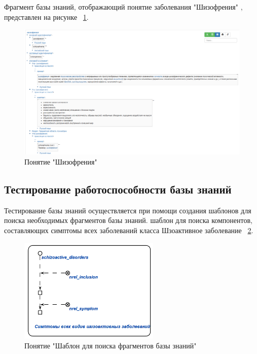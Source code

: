 Фрагмент базы знаний, отображающий понятие заболевания "Шизофрения" \cite{probolezny}$,$ представлен на рисунке
~\ref{fig:sections/schizophrenia}.
\begin{figure}[H]
	\centering
	\includegraphics[width=1.05\textwidth]{sections/schizophrenia.png}
	\caption{Понятие "Шизофрения"}
	\label{fig:sections/schizophrenia}
\end{figure}

\subsection{Тестирование работоспособности базы знаний}
Тестирование базы знаний осуществляется при помощи создания шаблонов для поиска необходимых фрагментов базы знаний.
шаблон для поиска компонентов, составляющих симптомы всех заболеваний класса Шзоактивное заболевание
~\ref{fig:sections/pattern_1}.
\begin{figure}[H]
	\centering
	\includegraphics[width=0.6\textwidth]{sections/pattern_1.png}
	\caption{Понятие "Шаблон для поиска фрагментов базы знаний"}
	\label{fig:sections/pattern_1}
\end{figure}


